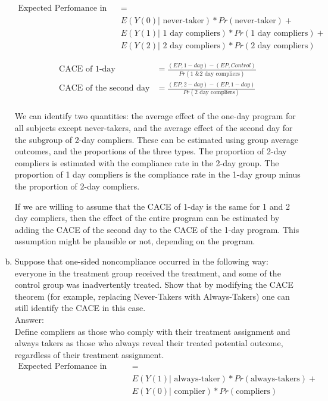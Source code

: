 \documentclass[11pt,notitlepage]{article}\usepackage[]{graphicx}\usepackage[]{color}
\begin{document}
\begin{enumerate}[a)]
\begin{align*}
\text{Expected Perfomance in 2-day group (EP, 2-day)} &= \\
&E(Y(0)|\text{ never-taker})*Pr(\text{never-taker}) + \\
&E(Y(1)|\text{ 1 day compliers})*Pr(\text{1 day compliers}) + \\
&E(Y(2)|\text{ 2 day compliers})*Pr(\text{2 day compliers})
\end{align*}

\begin{align*}
\text{CACE of 1-day} &= \frac{(EP, 1-day) - (EP, Control)}{Pr(\text{1 \& 2 day compliers})} \\
\text{CACE of the second day} &= \frac{(EP, 2-day) - (EP, 1-day)}{Pr(\text{2 day compliers})} \\
\end{align*}

We can identify two quantities: the average effect of the one-day program for all subjects except never-takers, and the average effect of the second day for the subgroup of 2-day compliers.  These can be estimated using group average outcomes, and the proportions of the three types. The proportion of 2-day compliers is estimated with the compliance rate in the 2-day group. The proportion of 1 day compliers is the compliance rate in the 1-day group minus the proportion of 2-day compliers.

If we are willing to assume that the CACE of 1-day is the same for 1 and 2 day compliers, then the effect of the entire program can be estimated by adding the CACE of the second day to the CACE of the 1-day program. This assumption might be plausible or not, depending on the program.

\item Suppose that one-sided noncompliance occurred in the following way: everyone in the treatment group received the treatment, and some of the control group was inadvertently treated. Show that by modifying the CACE theorem (for example, replacing Never-Takers with Always-Takers) one can still identify the CACE in this case.\\
Answer:\\
Define compliers as those who comply with their treatment assignment and always takers as those who always reveal their treated potential outcome, regardless of their treatment assignment.
\begin{align*}
\text{Expected Perfomance in Control (EP, Control)} &= \\
&E(Y(1)|\text{ always-taker})*Pr(\text{always-takers}) + \\
&E(Y(0)|\text{ complier})*Pr(\text{compliers})\\
\end{align*}


\end{enumerate}
\end{document}
